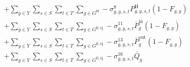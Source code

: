 \documentclass{article}
\newcommand{\sGeneratorsCandidateSolar}{G^{\mathrm{C,S}}}
\newcommand{\sGeneratorsHydro}{G^{\mathrm{H}}}
\newcommand{\sStorage}{G^{\mathrm{Q}}}
\newcommand{\sStorageExisting}{G^{\mathrm{E,Q}}}
\newcommand{\sStorageCandidate}{G^{\mathrm{C,Q}}}
\newcommand{\sYears}{Y}
\newcommand{\sScenarios}{S}
\newcommand{\sIntervals}{T}
\newcommand{\iGenerator}{g}
\newcommand{\iYear}{y}
\newcommand{\iScenario}{s}
\newcommand{\iInterval}{t}
\newcommand{\cCapacityFactorSolar}[1][\iGenerator,\iYear,\iScenario,\iInterval]{Q_{#1}^{\mathrm{S}}}
\newcommand{\cPowerChargingMax}[1][\iGenerator]{\overline{P}^{\mathrm{in}}_{#1}}
\newcommand{\cPowerDischargingMax}[1][\iGenerator]{\overline{P}^{\mathrm{out}}_{#1}}
\newcommand{\cStorageUnitEnergyMax}[1][\iGenerator]{\overline{Q}_{#1}}
\newcommand{\cRetirementIndicator}[1][\iGenerator,\iYear]{F_{#1}}
\newcommand{\cPowerOutputHydro}[1][\iGenerator,\iYear,\iScenario,\iInterval]{P^{\mathrm{H}}_{#1}}
\newcommand{\vPower}[1][\iGenerator,\iYear,\iScenario,\iInterval]{p_{#1}}
\newcommand{\vPowerIn}[1][\iGenerator,\iYear,\iScenario,\iInterval]{p^{\mathrm{in}}_{#1}}
\newcommand{\vPowerOut}[1][\iGenerator,\iYear,\iScenario,\iInterval]{p^{\mathrm{out}}_{#1}}
\newcommand{\vStorageUnitEnergy}[1][\iGenerator,\iYear,\iScenario,\iInterval]{q_{#1}}
\newcommand{\vInstalledCapacityTotal}[1][\iGenerator,\iYear]{a_{#1}}
\newcommand{\dMaxPowerOutputSolarCandidate}[1][\iGenerator,\iYear,\iScenario,\iInterval]{\sigma_{#1}^{7}}
\newcommand{\dMaxPowerOutputHydro}[1][\iGenerator,\iYear,\iScenario,\iInterval]{\sigma_{#1}^{8}}
\newcommand{\dNonNegativeCharging}[1][\iGenerator,\iYear,\iScenario,\iInterval]{\sigma_{#1}^{9}}
\newcommand{\dNonNegativeDischarging}[1][\iGenerator,\iYear,\iScenario,\iInterval]{\sigma_{#1}^{10}}
\newcommand{\dMaxChargingRateExisting}[1][\iGenerator,\iYear,\iScenario,\iInterval]{\sigma_{#1}^{11}}
\newcommand{\dMaxChargingRateCandidate}[1][\iGenerator,\iYear,\iScenario,\iInterval]{\sigma_{#1}^{12}}
\newcommand{\dMaxDischargingRateExisting}[1][\iGenerator,\iYear,\iScenario,\iInterval]{\sigma_{#1}^{13}}
\newcommand{\dMaxDischargingRateCandidate}[1][\iGenerator,\iYear,\iScenario,\iInterval]{\sigma_{#1}^{14}}
\newcommand{\dNonNegativeStorageEnergy}[1][\iGenerator,\iYear,\iScenario,\iInterval]{\sigma_{#1}^{15}}
\newcommand{\dMaxStorageEnergyExisting}[1][\iGenerator,\iYear,\iScenario,\iInterval]{\sigma_{#1}^{16}}
\begin{document}
\begin{align}
& + \sum\limits_{\iYear \in \sYears}\sum\limits_{\iScenario \in \sScenarios}\sum\limits_{\iInterval \in \sIntervals} \sum\limits_{\iGenerator \in \sGeneratorsHydro} - \dMaxPowerOutputHydro \cPowerOutputHydro \left(1 - \cRetirementIndicator\right)\\
& + \sum\limits_{\iYear \in \sYears}\sum\limits_{\iScenario \in \sScenarios}\sum\limits_{\iInterval \in \sIntervals} \sum\limits_{\iGenerator \in \sStorageExisting} - \dMaxChargingRateExisting \cPowerChargingMax \left(1 - \cRetirementIndicator\right)\\
& + \sum\limits_{\iYear \in \sYears}\sum\limits_{\iScenario \in \sScenarios}\sum\limits_{\iInterval \in \sIntervals} \sum\limits_{\iGenerator \in \sStorageExisting} - \dMaxDischargingRateExisting \cPowerDischargingMax \left(1 - \cRetirementIndicator\right)\\
& + \sum\limits_{\iYear \in \sYears}\sum\limits_{\iScenario \in \sScenarios}\sum\limits_{\iInterval \in \sIntervals} \sum\limits_{\iGenerator \in \sStorageExisting} - \dMaxStorageEnergyExisting \cStorageUnitEnergyMax\\

\end{align}
\end{document}
